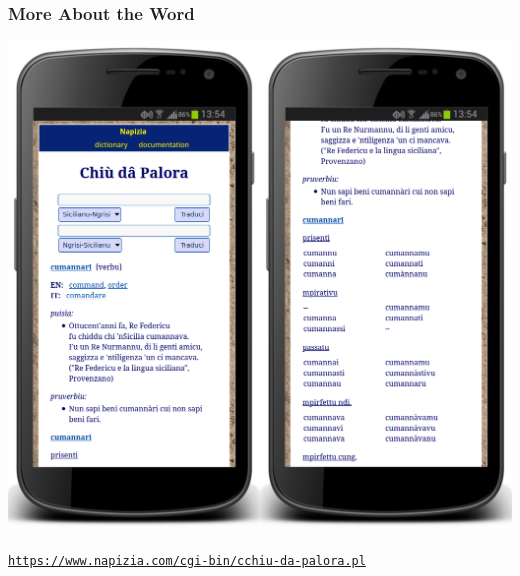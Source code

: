 \documentclass{beamer}
\begin{document}
\begin{frame}
  \frametitle{More About the Word}
  \vspace{-1.25em}
  \begin{center}
  \href{https://www.napizia.com/cgi-bin/cchiu-da-palora.pl}{%
    \includegraphics[height=0.755\textheight]{images/cdp_cumannari-new_v2.png}
  }
  \end{center}
  \vspace{-0.80em}
  \footnotesize{\href{https://www.napizia.com/cgi-bin/cchiu-da-palora.pl}{\texttt{https://www.napizia.com/cgi-bin/cchiu-da-palora.pl}}}
\end{frame}


\end{document}
